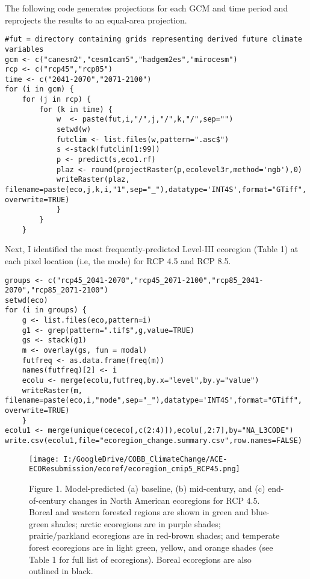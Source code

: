 \documentclass[]{article}
\begin{document}
The following code generates projections for each GCM and time period
and reprojects the results to an equal-area projection.

\begin{verbatim}
#fut = directory containing grids representing derived future climate variables
gcm <- c("canesm2","cesm1cam5","hadgem2es","mirocesm")
rcp <- c("rcp45","rcp85")
time <- c("2041-2070","2071-2100")
for (i in gcm) {
    for (j in rcp) {
        for (k in time) {
            w  <- paste(fut,i,"/",j,"/",k,"/",sep="")
            setwd(w)
            futclim <- list.files(w,pattern=".asc$")
            s <-stack(futclim[1:99])
            p <- predict(s,eco1.rf)
            plaz <- round(projectRaster(p,ecolevel3r,method='ngb'),0)
            writeRaster(plaz, filename=paste(eco,j,k,i,"1",sep="_"),datatype='INT4S',format="GTiff", overwrite=TRUE)
            }
        }   
    }
\end{verbatim}

Next, I identified the most frequently-predicted Level-III ecoregion
(Table 1) at each pixel location (i.e, the mode) for RCP 4.5 and RCP
8.5.

\begin{verbatim}
groups <- c("rcp45_2041-2070","rcp45_2071-2100","rcp85_2041-2070","rcp85_2071-2100")
setwd(eco)
for (i in groups) {
    g <- list.files(eco,pattern=i)
    g1 <- grep(pattern=".tif$",g,value=TRUE)
    gs <- stack(g1)
    m <- overlay(gs, fun = modal)   
    futfreq <- as.data.frame(freq(m))
    names(futfreq)[2] <- i
    ecolu <- merge(ecolu,futfreq,by.x="level",by.y="value")
    writeRaster(m, filename=paste(eco,i,"mode",sep="_"),datatype='INT4S',format="GTiff", overwrite=TRUE)
    }
ecolu1 <- merge(unique(cececo[,c(2:4)]),ecolu[,2:7],by="NA_L3CODE")
write.csv(ecolu1,file="ecoregion_change.summary.csv",row.names=FALSE)
\end{verbatim}

\begin{figure}
\centering
\texttt{[image: I:/GoogleDrive/COBB\_ClimateChange/ACE-ECOResubmission/ecoref/ecoregion\_cmip5\_RCP45.png]}
\caption{Figure 1. Model-predicted (a) baseline, (b) mid-century, and
(c) end-of-century changes in North American ecoregions for RCP 4.5.
Boreal and western forested regions are shown in green and blue-green
shades; arctic ecoregions are in purple shades; prairie/parkland
ecoregions are in red-brown shades; and temperate forest ecoregions are
in light green, yellow, and orange shades (see Table 1 for full list of
ecoregions). Boreal ecoregions are also outlined in black.}
\end{figure}
\end{document}

